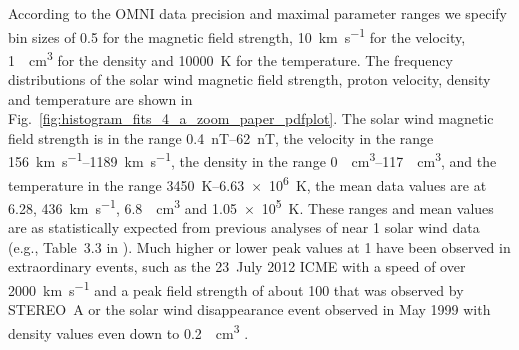 According to the OMNI data precision and maximal parameter ranges we specify bin sizes of \SI{0.5}{\nT} for the magnetic field strength, \SI{10}{\km\per\s} for the velocity, \SI{1}{\per\cm\cubed} for the density and \SI{10000}{\K} for the temperature. The frequency distributions of the solar wind magnetic field strength, proton velocity, density and temperature are shown in Fig.~\ref{fig:histogram_fits_4_a_zoom_paper_pdfplot}.
The solar wind magnetic field strength is in the range \SIrange{0.4}{62}{nT}, the velocity in the range \SIrange{156}{1189}{\km\per\s}, the density in the range \SIrange{0}{117}{\per\cm\cubed}, and the temperature in the range \SIrange{3450}{6.63e6}{\K}, the mean data values are at \SI{6.28}{\nT}, \SI{436}{\km\per\s}, \SI{6.8}{\per\cm\cubed} and \SI{1.05e5}{\K}. These ranges and mean values are as statistically expected from previous analyses of near \SI{1}{\au} solar wind data (e.g., Table~3.3 in \citet[p.~39]{Bothmer2007}).
Much higher or lower peak values at \SI{1}{\au} have been observed in extraordinary events, such as the 23~July 2012 ICME with a speed of over \SI{2000}{\km\per\s} and a peak field strength of about \SI{100}{\nT} that was observed by STEREO~A \citep{Russell2013} or the solar wind disappearance event observed in May 1999 with density values even down to \SI{0.2}{\per\cm\cubed} \citep{Lazarus2000}.


